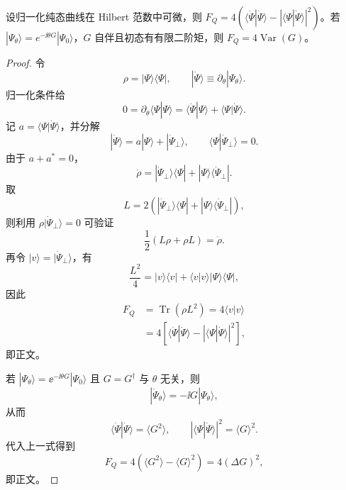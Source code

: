 \begin{proposition}
设归一化纯态曲线在 Hilbert 范数中可微，则 $F_Q=4(\langle\dot\Psi|\dot\Psi\rangle-|\langle\Psi|\dot\Psi\rangle|^2)$。若 $|\Psi_\theta\rangle=e^{-\ii\theta G}|\Psi_0\rangle$，$G$ 自伴且初态有有限二阶矩，则 $F_Q=4\operatorname{Var}(G)$。
\end{proposition}
\begin{proof}
令
\begin{equation*}
\rho=|\Psi\rangle\langle\Psi|,
\qquad
|\dot\Psi\rangle\equiv\partial_\theta|\Psi_\theta\rangle.
\end{equation*}
归一化条件给
\begin{equation*}
0=\partial_\theta\langle\Psi|\Psi\rangle
=\langle\dot\Psi|\Psi\rangle+\langle\Psi|\dot\Psi\rangle.
\end{equation*}
记 $a=\langle\Psi|\dot\Psi\rangle$，并分解
\begin{equation*}
|\dot\Psi\rangle=a|\Psi\rangle+|\dot\Psi_\perp\rangle,
\qquad
\langle\Psi|\dot\Psi_\perp\rangle=0.
\end{equation*}
由于 $a+a^*=0$，
\begin{equation*}
\dot\rho
=|\dot\Psi_\perp\rangle\langle\Psi|
+|\Psi\rangle\langle\dot\Psi_\perp|.
\end{equation*}
取
\begin{equation*}
L=2\left(
|\dot\Psi_\perp\rangle\langle\Psi|
+|\Psi\rangle\langle\dot\Psi_\perp|
\right),
\end{equation*}
则利用 $\rho|\dot\Psi_\perp\rangle=0$ 可验证
\begin{equation*}
\frac12(L\rho+\rho L)=\dot\rho.
\end{equation*}
再令 $|v\rangle=|\dot\Psi_\perp\rangle$，有
\begin{equation*}
\frac{L^2}{4}
=|v\rangle\langle v|+\langle v|v\rangle|\Psi\rangle\langle\Psi|,
\end{equation*}
因此
\begin{align*}
F_Q
&=\operatorname{Tr}(\rho L^2)
=4\langle v|v\rangle\\
&=4\left[
\langle\dot\Psi|\dot\Psi\rangle
-|\langle\Psi|\dot\Psi\rangle|^2
\right],
\end{align*}
即正文。

若 $|\Psi_\theta\rangle=\ee^{-\ii\theta G}|\Psi_0\rangle$ 且 $G=G^\dagger$ 与 $\theta$ 无关，则
\begin{equation*}
|\dot\Psi_\theta\rangle=-\ii G|\Psi_\theta\rangle,
\end{equation*}
从而
\begin{equation*}
\langle\dot\Psi|\dot\Psi\rangle=\langle G^2\rangle,
\qquad
|\langle\Psi|\dot\Psi\rangle|^2=\langle G\rangle^2.
\end{equation*}
代入上一式得到
\begin{equation*}
F_Q=4\left(\langle G^2\rangle-\langle G\rangle^2\right)
=4(\Delta G)^2,
\end{equation*}
即正文。
\end{proof}


